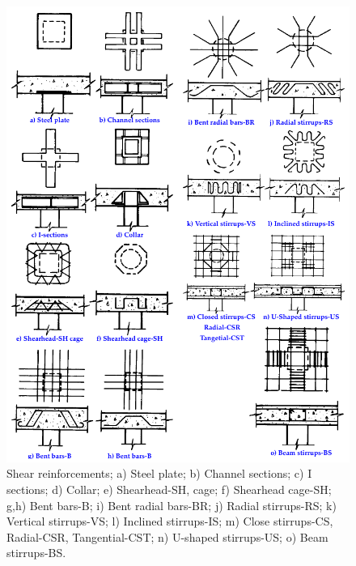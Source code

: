 \documentclass[twocolumn]{article} %
\begin{document}
\begin{figure}\centering
\includegraphics[width=\columnwidth]{Figures/tikzout/h74f1m.pdf}
\caption{Shear reinforcements\citep{hawkins1974a}; a) Steel plate\citep{moe1961}; b) Channel sections\citep{hawkins1974}; c) $\mathrm{I}$ sections\citep{hawkins1974}; d) Collar\citep{tasker1963}; e) Shearhead-SH, cage; f) Shearhead cage-SH; g,h) Bent bars-B; i) Bent radial bars-BR; j) Radial stirrups-RS; k) Vertical stirrups-VS; l) Inclined stirrups-IS; m) Close stirrups-CS, Radial-CSR, Tangential-CST; n) U-shaped stirrups-US; o) Beam stirrups-BS.}\label{h74f1}
\end{figure}
\end{document}
